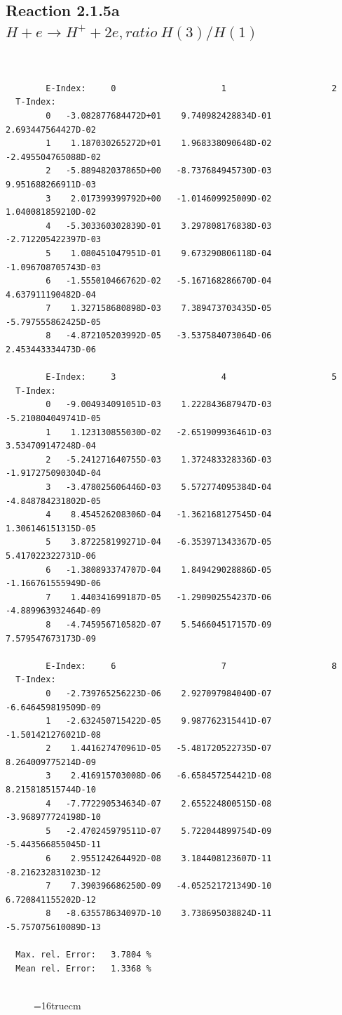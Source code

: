 \documentclass[12pt,dvips]{article}
\begin{document}
\subsection{
Reaction 2.1.5a  $H + e \rightarrow H^+ + 2e , ratio~ H(3)/H(1)$
}

\begin{small}\begin{verbatim}


        E-Index:     0                     1                     2
  T-Index:
        0   -3.082877684472D+01    9.740982428834D-01    2.693447564427D-02
        1    1.187030265272D+01    1.968338090648D-02   -2.495504765088D-02
        2   -5.889482037865D+00   -8.737684945730D-03    9.951688266911D-03
        3    2.017399399792D+00   -1.014609925009D-02    1.040081859210D-02
        4   -5.303360302839D-01    3.297808176838D-03   -2.712205422397D-03
        5    1.080451047951D-01    9.673290806118D-04   -1.096708705743D-03
        6   -1.555010466762D-02   -5.167168286670D-04    4.637911190482D-04
        7    1.327158680898D-03    7.389473703435D-05   -5.797555862425D-05
        8   -4.872105203992D-05   -3.537584073064D-06    2.453443334473D-06

        E-Index:     3                     4                     5
  T-Index:
        0   -9.004934091051D-03    1.222843687947D-03   -5.210804049741D-05
        1    1.123130855030D-02   -2.651909936461D-03    3.534709147248D-04
        2   -5.241271640755D-03    1.372483328336D-03   -1.917275090304D-04
        3   -3.478025606446D-03    5.572774095384D-04   -4.848784231802D-05
        4    8.454526208306D-04   -1.362168127545D-04    1.306146151315D-05
        5    3.872258199271D-04   -6.353971343367D-05    5.417022322731D-06
        6   -1.380893374707D-04    1.849429028886D-05   -1.166761555949D-06
        7    1.440341699187D-05   -1.290902554237D-06   -4.889963932464D-09
        8   -4.745956710582D-07    5.546604517157D-09    7.579547673173D-09

        E-Index:     6                     7                     8
  T-Index:
        0   -2.739765256223D-06    2.927097984040D-07   -6.646459819509D-09
        1   -2.632450715422D-05    9.987762315441D-07   -1.501421276021D-08
        2    1.441627470961D-05   -5.481720522735D-07    8.264009775214D-09
        3    2.416915703008D-06   -6.658457254421D-08    8.215818515744D-10
        4   -7.772290534634D-07    2.655224800515D-08   -3.968977724198D-10
        5   -2.470245979511D-07    5.722044899754D-09   -5.443566855045D-11
        6    2.955124264492D-08    3.184408123607D-11   -8.216232831023D-12
        7    7.390396686250D-09   -4.052521721349D-10    6.720841155202D-12
        8   -8.635578634097D-10    3.738695038824D-11   -5.757075610089D-13

  Max. rel. Error:   3.7804 %
  Mean rel. Error:   1.3368 %


\end{verbatim}\end{small}
\begin{figure} \label{2.1.5a}
\epsfxsize=16truecm
\end{figure}
\end{document}

